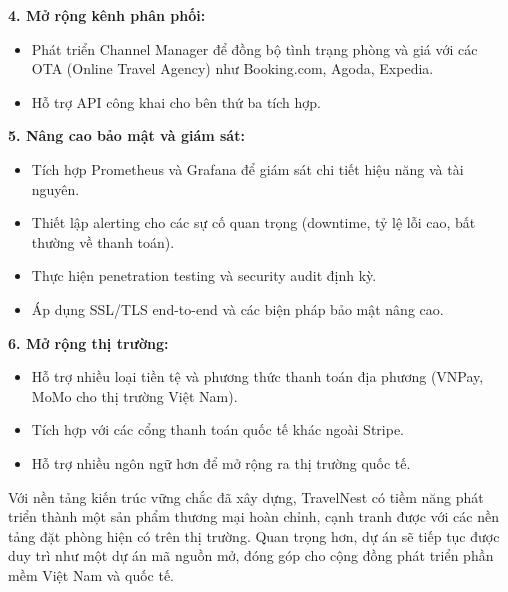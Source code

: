 \documentclass[13pt,a4paper,twoside]{report}
\begin{document}
\textbf{4. Mở rộng kênh phân phối:}

\begin{itemize}
  \item Phát triển Channel Manager để đồng bộ tình trạng phòng và giá với các OTA (Online Travel Agency) như Booking.com, Agoda, Expedia.
  \item Hỗ trợ API công khai cho bên thứ ba tích hợp.
\end{itemize}

\textbf{5. Nâng cao bảo mật và giám sát:}

\begin{itemize}
  \item Tích hợp Prometheus và Grafana để giám sát chi tiết hiệu năng và tài nguyên.
  \item Thiết lập alerting cho các sự cố quan trọng (downtime, tỷ lệ lỗi cao, bất thường về thanh toán).
  \item Thực hiện penetration testing và security audit định kỳ.
  \item Áp dụng SSL/TLS end-to-end và các biện pháp bảo mật nâng cao.
\end{itemize}

\textbf{6. Mở rộng thị trường:}

\begin{itemize}
  \item Hỗ trợ nhiều loại tiền tệ và phương thức thanh toán địa phương (VNPay, MoMo cho thị trường Việt Nam).
  \item Tích hợp với các cổng thanh toán quốc tế khác ngoài Stripe.
  \item Hỗ trợ nhiều ngôn ngữ hơn để mở rộng ra thị trường quốc tế.
\end{itemize}

Với nền tảng kiến trúc vững chắc đã xây dựng, TravelNest có tiềm năng phát triển thành một sản phẩm thương mại hoàn chỉnh, cạnh tranh được với các nền tảng đặt phòng hiện có trên thị trường. Quan trọng hơn, dự án sẽ tiếp tục được duy trì như một dự án mã nguồn mở, đóng góp cho cộng đồng phát triển phần mềm Việt Nam và quốc tế.
\end{document}
